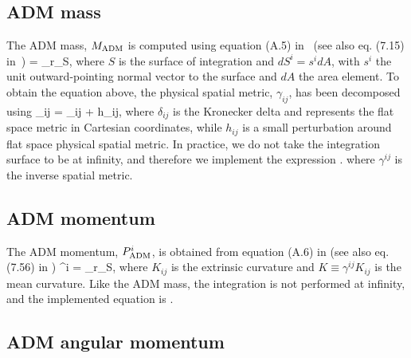 \subsection{ADM mass}
\label{sec:ADM_mass_integral}

The ADM mass, $M_{\rm ADM}$ is computed using equation (A.5) in~\cite{alcubierre2008introduction}
(see also eq. (7.15) in~\cite{gourgoulhon20073+})
\beq
\Madm = \lim_{r\to\infty}\oint_{S},
\eeq
where $S$ is the surface of integration and $dS^{i} = s^{i}dA$, with
$s^{i}$ the unit outward-pointing normal vector to the surface and
$dA$ the area element. To obtain the equation above, the physical
spatial metric, $\gamma_{ij}$, has been decomposed using
\beq
\gamma_{ij} = \delta_{ij} + h_{ij},
\eeq
where $\delta_{ij}$ is the Kronecker delta and represents the flat
space metric in Cartesian coordinates, while $h_{ij}$ is a small
perturbation around flat space physical spatial metric. In practice,
we do not take the integration surface to be at infinity, and therefore
we implement the expression
\beq
{}\; .
\eeq
where $\gamma^{ij}$ is the inverse spatial metric.

\subsection{ADM momentum}
\label{sec:ADM_momentum_integral}

The ADM momentum, $P_{\rm ADM}^{i}$, is obtained from equation (A.6) in
\cite{alcubierre2008introduction} (see also eq. (7.56) in
\cite{gourgoulhon20073+})
\beq
\Padm^{i} = \lim_{r\to\infty}\oint_{S},
\eeq
where $K_{ij}$ is the extrinsic curvature and $K\equiv\gamma^{ij}K_{ij}$
is the mean curvature. Like the ADM mass, the integration is not performed
at infinity, and the implemented equation is
\beq
{}\; .
\eeq

\subsection{ADM angular momentum}
\label{sec:ADM_angular_momentum_integral}

